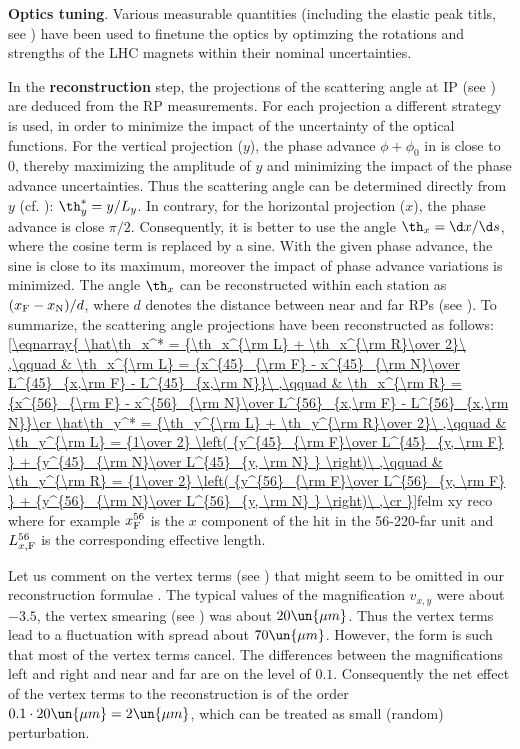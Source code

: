 \> {\bf Optics tuning}. Various measurable quantities (including the elastic peak titls, see ) have been used to finetune the optics by optimzing the rotations and strengths of the LHC magnets within their nominal uncertainties.

\> In the {\bf reconstruction} step, the projections of the scattering angle at IP (see ) are deduced from the RP measurements. For each projection a different strategy is used, in order to minimize the impact of the uncertainty of the optical functions. For the vertical projection ($y$), the phase advance $\phi+\phi_0$ in  is close to $0$, thereby maximizing the amplitude of $y$ and minimizing the impact of the phase advance uncertainties. Thus the scattering angle can be determined directly from $y$ (cf. ): $\th_y^* = y/L_y$. In contrary, for the horizontal projection ($x$), the phase advance is close $\pi/2$. Consequently, it is better to use the angle $\th_x = \d x/\d s$, where the cosine term is replaced by a sine. With the given phase advance, the sine is close to its maximum, moreover the impact of phase advance variations is minimized. The angle $\th_x$ can be reconstructed within each station as $(x_{\rm F} - x_{\rm N}) / d$, where $d$ denotes the distance between near and far RPs (see ). To summarize, the scattering angle projections have been reconstructed as follows:
\eqref{\eqnarray{
	\hat\th_x^* = {\th_x^{\rm L} + \th_x^{\rm R}\over 2}\ ,\qquad
		& \th_x^{\rm L} = {x^{45}_{\rm F} - x^{45}_{\rm N}\over L^{45}_{x,\rm F} - L^{45}_{x,\rm N}}\ ,\qquad
		& \th_x^{\rm R} = {x^{56}_{\rm F} - x^{56}_{\rm N}\over L^{56}_{x,\rm F} - L^{56}_{x,\rm N}}\cr
	\hat\th_y^* = {\th_y^{\rm L} + \th_y^{\rm R}\over 2}\ ,\qquad
		& \th_y^{\rm L} = {1\over 2} \left( {y^{45}_{\rm F}\over L^{45}_{y, \rm F} } + {y^{45}_{\rm N}\over L^{45}_{y, \rm N} } \right)\ ,\qquad
		& \th_y^{\rm R} = {1\over 2} \left( {y^{56}_{\rm F}\over L^{56}_{y, \rm F} } + {y^{56}_{\rm N}\over L^{56}_{y, \rm N} } \right)\ ,\cr
}}{felm xy reco}
where for example $x^{56}_{\rm F}$ is the $x$ component of the hit in the 56-220-far unit and $L^{56}_{x, \rm F}$ is the corresponding effective length. 

\par\parindent\itindent\indent\hang
Let us comment on the vertex terms (see ) that might seem to be omitted in our reconstruction formulae . The typical values of the magnification $v_{x, y}$ were about $-3.5$, the vertex smearing (see ) was about $20\un{\mu m}$. Thus the vertex terms lead to a fluctuation with spread about $70\un{\mu m}$. However, the form  is such that most of the vertex terms cancel. The differences between the magnifications left and right and near and far are on the level of $0.1$. Consequently the net effect of the vertex terms to the reconstruction is of the order $0.1 \cdot 20\un{\mu m} = 2\un{\mu m}$, which can be treated as small (random) perturbation.

